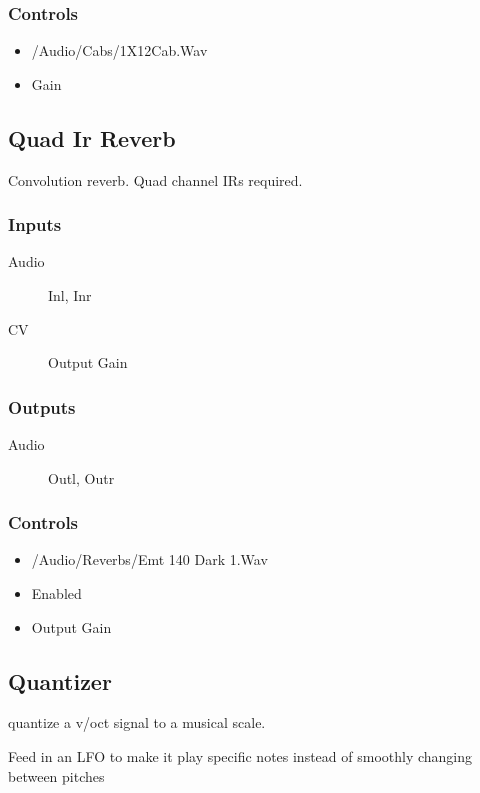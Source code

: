 \subsubsection{Controls}
\begin{itemize}
\item /Audio/Cabs/1X12Cab.Wav
\item Gain
\end{itemize}

\subsection{Quad Ir Reverb}

Convolution reverb. Quad channel IRs required.



\subsubsection{Inputs}
\begin{description}
\item [Audio] Inl, Inr
\item [CV] Output Gain
\end{description}

\subsubsection{Outputs}
\begin{description}
\item [Audio] Outl, Outr
\end{description}

\subsubsection{Controls}
\begin{itemize}
\item /Audio/Reverbs/Emt 140 Dark 1.Wav
\item Enabled
\item Output Gain
\end{itemize}

\subsection{Quantizer}

quantize a v/oct signal to a musical scale.

Feed in an LFO to make it play specific notes instead of smoothly changing between pitches

